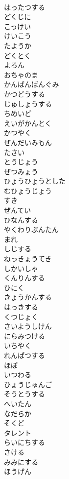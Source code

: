 \documentclass[8pt]{extreport}
\begin{document}
\begin{CJK}{UTF8}{min}
\\	はったつする
\\	どくじに
\\	こっけい
\\	けいこう
\\	たようか
\\	どくとく
\\	よろん
\\	おちゃのま
\\	かんばんばんぐみ
\\	かつどうする
\\	じゅしょうする
\\	ちめいど
\\	えいがかんとく
\\	かつやく
\\	ぜんだいみもん
\\	たさい
\\	とうじょう
\\	ぜつみょう
\\	ひょうひょうとした
\\	むひょうじょう
\\	すき
\\	ぜんてい
\\	ひなんする
\\	やくわりぶんたん
\\	まれ
\\	しじする
\\	ねっきょうてき
\\	しかいしゃ
\\	くんりんする
\\	ひにく
\\	きょうかんする
\\	はっきする
\\	くつじょく
\\	さいようしけん
\\	にらみつける
\\	いちやく
\\	れんぱつする
\\	ほぼ
\\	いつわる
\\	ひょうじゅんご
\\	そうとうする
\\	へいたん
\\	なだらか
\\	そくど
\\	タレント
\\	らいにちする
\\	さける
\\	みみにする
\\	ほうげん

\end{CJK}
\end{document}
